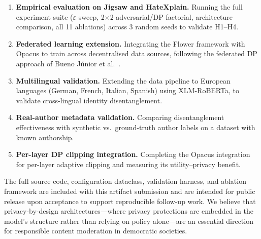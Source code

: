\documentclass{article}
\begin{document}
\begin{enumerate}
  \item \textbf{Empirical evaluation on Jigsaw and HateXplain.} Running
        the full experiment suite ($\varepsilon$ sweep, 2$\times$2
        adversarial/DP factorial, architecture comparison, all 11
        ablations) across 3 random seeds to validate H1--H4.
  \item \textbf{Federated learning extension.} Integrating the Flower
        framework with Opacus to train across decentralised data sources,
        following the federated DP approach of Bueno J\'unior et
        al.~\cite{bueno2025privacy}.
  \item \textbf{Multilingual validation.} Extending the data pipeline to
        European languages (German, French, Italian, Spanish) using
        XLM-RoBERTa, to validate cross-lingual identity disentanglement.
  \item \textbf{Real-author metadata validation.} Comparing disentanglement
        effectiveness with synthetic vs.\ ground-truth author labels on
        a dataset with known authorship.
  \item \textbf{Per-layer DP clipping integration.} Completing the Opacus
        integration for per-layer adaptive clipping and measuring its
        utility--privacy benefit.
\end{enumerate}

The full source code, configuration dataclass, validation harness, and
ablation framework are included with this artifact submission and are
intended for public release upon acceptance to support reproducible
follow-up work.
We believe that privacy-by-design architectures---where privacy
protections are embedded in the model's structure rather than relying
on policy alone---are an essential direction for responsible content
moderation in democratic societies.


\end{document}
